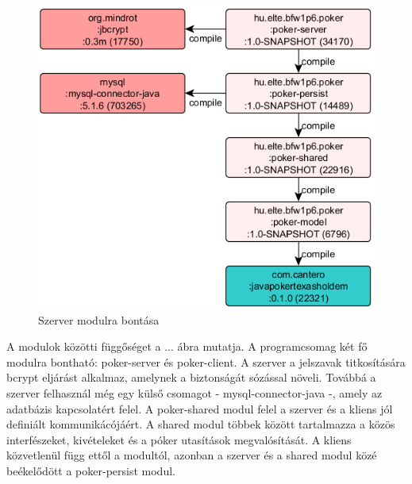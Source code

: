 \begin{figure}[h!]
	\caption{Szerver modulra bontása}
	\centering
	\includegraphics{user-documentation/images/poker-server-deps.png}
\end{figure}
A modulok közötti függőséget a ... ábra mutatja. A programcsomag két fő modulra bontható: poker-server és poker-client. A szerver a jelszavak titkosítására bcrypt eljárást alkalmaz, amelynek a biztonságát sózással növeli. Továbbá a szerver felhasznál még egy külső csomagot - mysql-connector-java -, amely az adatbázis kapcsolatért felel.
A poker-shared modul felel a szerver és a kliens jól definiált kommunikácójáért. A shared modul többek között tartalmazza a közös interfészeket, kivételeket és a póker utasítások megvalósítását. A kliens közvetlenül függ ettől a modultól, azonban a szerver és a shared modul közé beékelődött a poker-persist modul.

